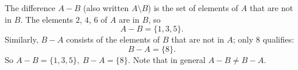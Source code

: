 The difference $A-B$ (also written $A\setminus B$) is the set of elements of $A$ that are not in $B$. The elements $2$, $4$, $6$ of $A$ are in $B$, so
\[
A-B=\{1,3,5\}.
\]
Similarly, $B-A$ consists of the elements of $B$ that are not in $A$; only $8$ qualifies:
\[
B-A=\{8\}.
\]
So $\boxed{A-B=\{1,3,5\},\ B-A=\{8\}}$. Note that in general $A-B\ne B-A$.
